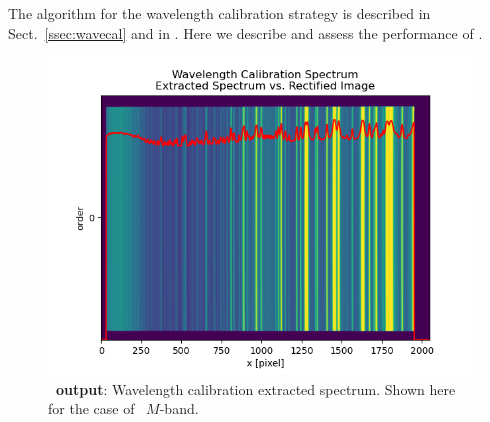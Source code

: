 The algorithm for the wavelength calibration strategy is described in Sect.~\ref{ssec:wavecal} and in \cite{pis02, pis21}. Here we describe and assess the performance of \pyred. 




\begin{figure}[!ht]
  \centering
  \includegraphics[width=\textwidth]{figures/LSS_CrtAlg_files/Figure_12.png}
  \caption{\textbf{\pyred~output}: Wavelength calibration extracted spectrum. Shown here for the case of \lss~$M$-band.}
  \label{fig:fig9}
\end{figure}

